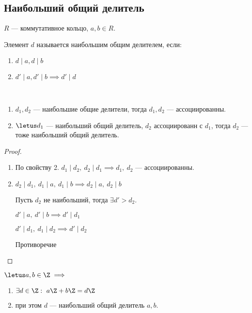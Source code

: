 \subsection{Наибольший общий делитель}

\begin{defn}
    $R$ --- коммутативное кольцо, $a, b \in R$.

    Элемент $d$ называется наибольшим общим делителем, если:

    \begin{enumerate}
        \item $d \mid a, d \mid b$
        \item $d' \mid a, d' \mid b \implies d' \mid d$
    \end{enumerate}
\end{defn}

\begin{theorem-non}~
    \begin{enumerate}
        \item $d_1, d_2$ --- наибольшие общие делители, тогда $d_1, d_2$ --- ассоциированны.
        
        \item $\letus d_1$ --- наибольший общий делитель, $d_2$ ассоциированн с $d_1$, тогда $d_2$ --- тоже наибольший общий делитель.
    \end{enumerate}
\end{theorem-non}

\begin{proof}
    \begin{enumerate}
        \item По свойству 2. $d_1 \mid d_2,~d_2 \mid d_1 \implies d_1,~d_2$ --- ассоциированны.
        
        \item $d_2 \mid d_1,~d_1 \mid a,~d_1 \mid b \implies d_2 \mid a,~d_2 \mid b$
        
        Пусть $d_2$ не наибольший, тогда $\exists d' > d_2$.
        
        $d' \mid a,~d' \mid b \implies d' \mid d_1$
        
        $d' \mid d_1,~d_1 \mid d_2 \implies d' \mid d_2$
        
        Противоречие
    \end{enumerate}
\end{proof}

\begin{theorem-non} 
    $\letus a, b \in \Z \implies$
    
    \begin{enumerate}
        \item $\exists d \in \Z:~a\Z + b\Z = d\Z$
        
        \item при этом $d$ --- наибольший общий делитель $a, b$.
    \end{enumerate}
\end{theorem-non}

